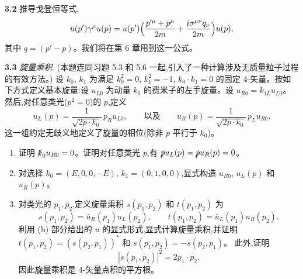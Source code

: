 \textbf{3.2} 推导戈登恒等式,
\begin{equation}
  \bar{u}(p')\gamma^\mu u(p) = \bar{u}(p')\Bigl(
    \frac{p'^{\mu} + p^{\mu}}{2m} + \frac{i\sigma^{\mu\nu}q_\nu}{2m}
    \Bigr)u(p),
\end{equation}
其中 $q = (p' - p)$。我们将在第 6 章用到这一公式。

\textbf{3.3} \emph{旋量乘积}.  (本题连同习题 5.3 和 5.6 一起,引入了一种计算涉及无质量粒子过程的有效方法。) 设 $k_0$, $k_1$ 为满足 $k_0^2 = 0$, $k_1^2 = -1$, $k_0\cdot k_1 = 0$ 的固定 4-矢量。按如下方式定义基本旋量:设 $u_{L0}$ 为动量 $k_0$ 的费米子的左手旋量。设 $u_{R0} = k_{1L}u_{L0}$。然后,对任意类光($p^2 = 0$)的 $p$,定义
\begin{equation}
  u_L(p) = \frac{1}{\sqrt{2p\cdot k_0}}\,p_{R}u_{L0},\qquad
  \text{以及}\qquad
  u_R(p) = \frac{1}{\sqrt{2p\cdot k_0}}\,p_{L}u_{R0}.
\end{equation}
这一组约定无歧义地定义了旋量的相位(除非 $p$ 平行于 $k_0$)。
\begin{enumerate}[label=(\alph*)]
  \item 证明 $\slashed{k}_0 u_{R0} = 0$。证明对任意类光 $p$,有 $\slashed{p}u_L(p) = \slashed{p}u_R(p) = 0$。
  \item 对选择 $k_0 = (E, 0, 0, -E)$, $k_1 = (0, 1, 0, 0)$,显式构造 $u_{R0}$, $u_L(p)$ 和 $u_R(p)$。
  \item 对类光的 $p_1, p_2$,定义旋量乘积 $s(p_1, p_2)$ 和 $t(p_1, p_2)$ 为
    \begin{equation}
      s(p_1, p_2) = \bar{u}_R(p_1)u_L(p_2),\qquad
      t(p_1, p_2) = \bar{u}_L(p_1)u_R(p_2) .
    \end{equation}
    利用 (b) 部分给出的 $u$ 的显式形式,显式计算旋量乘积,并证明
    $t(p_1, p_2) = (s(p_2, p_1))^{*}$ 和 $s(p_1, p_2) = -s(p_2, p_1)$。
    此外,证明
    \begin{equation}
      |s(p_1, p_2)|^2 = 2p_1\cdot p_2 .
    \end{equation}
    因此旋量乘积是 4-矢量点积的平方根。
\end{enumerate}

